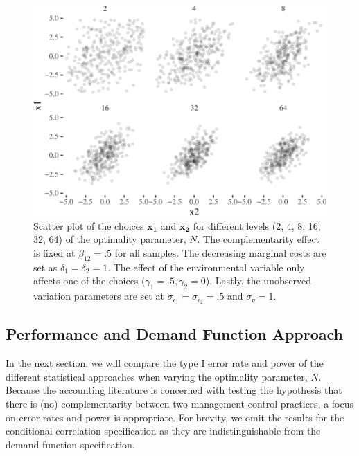 \documentclass[12pt]{article}
\begin{document}
\begin{figure}

\includegraphics[width=500px]{figure-latex/scatter-1}
\caption[Distribution of Choices for Different Levels of
Optimality]{\label{scatter} Scatter plot of the choices $\mathbf{x_1}$ and
$\mathbf{x_2}$ for different levels (2, 4, 8, 16, 32, 64) of the optimality
parameter, $N$. The complementarity effect is fixed at $\beta_{12} = .5$ for all
samples. The decreasing marginal costs are set as $\delta_1 = \delta_2 = 1$. The
effect of the environmental variable only affects one of the choices
($\gamma_1 = .5, \gamma_2 = 0$). Lastly, the unobserved variation parameters are
set at $\sigma_{\epsilon_1} = \sigma_{\epsilon_2} = .5$ and $\sigma_{\nu} = 1.$}
\end{figure}

\subsection{Performance and Demand Function
Approach}\label{performance-and-demand-function-approach}

In the next section, we will compare the type I error rate and power of
the different statistical approaches when varying the optimality
parameter, \(N\). Because the accounting literature is concerned with
testing the hypothesis that there is (no) complementarity between two
management control practices, a focus on error rates and power is
appropriate. For brevity, we omit the results for the conditional
correlation specification as they are indistinguishable from the demand
function specification.
\end{document}
